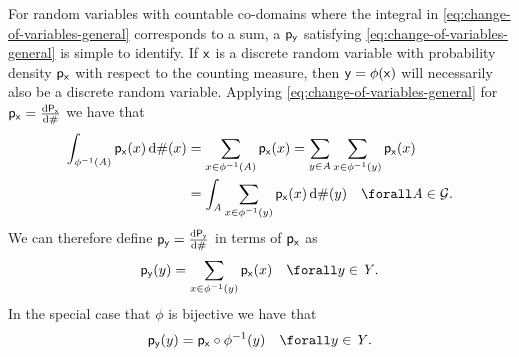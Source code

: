 For random variables with countable co-domains where the integral in \eqref{eq:change-of-variables-general} corresponds to a sum, a $\mathsf{p}_{\mathsf{y}}$ satisfying \eqref{eq:change-of-variables-general} is simple to identify. If $\mathsf{x}$ is a discrete random variable with probability density $\mathsf{p}_{\mathsf{x}}$ with respect to the counting measure, then $\mathsf{y} = \phi(\mathsf{x})$ will necessarily also be a discrete random variable. Applying \eqref{eq:change-of-variables-general} for $\mathsf{p}_{\mathsf{x}} = \frac{\mathrm{d} \mathsf{P}_{\mathsf{x}}}{\mathrm{d} \#}$ we have that
\begin{align}\label{eq:change-of-variables-discrete-derivation}
  \int_{\phi^{-1}(\set{A})} \pden{\rvar{x}}(x) \,\dr\countm(x) &= 
  \sum_{x\in\phi^{-1}(\set{A})} \pden{\rvar{x}}(x)  =
  \sum_{y \in \set{A}} \sum_{x\in\phi^{-1}(y)} \pden{\rvar{x}}(x) \nonumber \\
  &= \int_{\set{A}} \sum_{x\in\phi^{-1}(y)} \pden{\rvar{x}}(x) \,\dr\countm(y)
  \quad \forall \set{A} \in \sset{G}.
\end{align}
We can therefore define $\mathsf{p}_{\mathsf{y}} = \frac{\mathrm{d} \mathsf{P}_{\mathsf{y}}}{\mathrm{d} \#}$ in terms of $\mathsf{p}_{\mathsf{x}}$ as
\begin{equation}\label{eq:change-of-variables-discrete}
  \pden{\rvar{y}}(y) = \sum_{x \in \phi^{-1}(y)} \pden{\rvar{x}}(x)
  \quad \forall y \in \set{Y}.
\end{equation}
In the special case that $\phi$ is bijective we have that 
\begin{equation}\label{eq:change-of-variables-discrete-bijective}
  \pden{\rvar{y}}(y) = \pden{\rvar{x}}\circ\phi^{-1}(y)
  \quad \forall y \in \set{Y}.
\end{equation}

